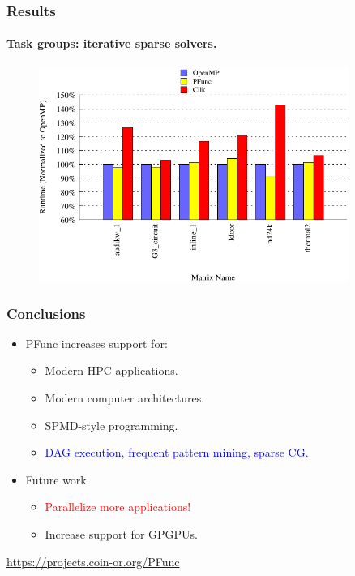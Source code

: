 \documentclass{beamer}
\begin{document}
\begin{frame}[fragile]
\frametitle{Results}
\framesubtitle{Task groups: iterative sparse solvers.}
\begin{figure}
\includegraphics[width=0.9\textwidth]{figs/cg_8}
\label{fig:cg}
\end{figure}
\end{frame}

\begin{frame}
\frametitle{Conclusions}
\begin{itemize}
\item PFunc increases support for:
  \begin{itemize}
  \item Modern HPC applications.
  \item Modern computer architectures.
  \item SPMD-style programming.
  \item \textcolor{blue}{DAG execution, frequent pattern mining, sparse CG.}
  \end{itemize}
\item Future work.
  \begin{itemize}
  \item \textcolor{red}{Parallelize more applications!}
  \item Increase support for GPGPUs.
  \end{itemize}
\end{itemize}

\vspace{+10pt}

\begin{center}
\url{https://projects.coin-or.org/PFunc}
\end{center}

\end{frame}
\end{document}

